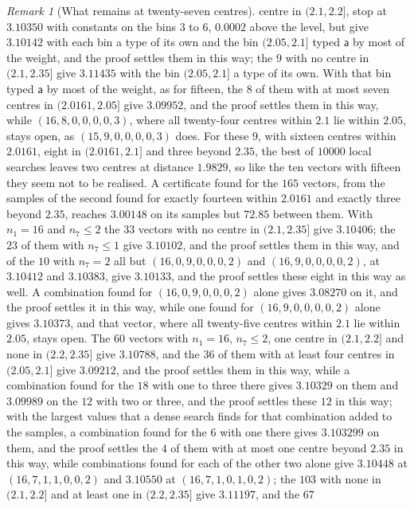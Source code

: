 \documentclass[11pt,reqno]{amsart}
\renewcommand{\_}{\origunderscore\allowbreak}
\numberwithin{equation}{section}
\theoremstyle{plain}
\theoremstyle{definition}
\theoremstyle{remark}
\newtheorem{remark}[thm]{Remark}
\begin{document}
\begin{remark}[What remains at twenty-seven centres]
centre in $(2.1,2.2]$, stop at $3.10350$ with constants on the bins $3$ to
$6$, $0.0002$ above the level, but give $3.10142$ with each bin a type of
its own and the bin $(2.05,2.1]$ typed $\mathsf a$ by most of the weight,
and the proof settles them in this way; the $9$ with no centre in $(2.1,2.35]$
give $3.11435$ with the bin $(2.05,2.1]$ a type of its own. With that bin
typed $\mathsf a$ by most of the weight, as for fifteen, the $8$ of them
with at most seven centres in $(2.0161,2.05]$ give $3.09952$, and the proof
settles them in this way, while $(16,8,0,0,0,0,3)$, where all twenty-four
centres within $2.1$ lie within $2.05$, stays open, as $(15,9,0,0,0,0,3)$
does. For these $9$, with sixteen centres within $2.0161$, eight in
$(2.0161,2.1]$ and three beyond $2.35$, the best of $10000$ local searches
leaves two centres at distance $1.9829$, so like the ten vectors with
fifteen they seem not to be realised. A certificate
found for the $165$ vectors,
from the samples of the second found for exactly fourteen within $2.0161$
and exactly three beyond $2.35$, reaches $3.00148$ on its samples but
$72.85$ between them. With $n_1=16$ and $n_7\le2$ the $33$ vectors with no
centre in $(2.1,2.35]$ give $3.10406$; the $23$ of them
with $n_7\le1$ give $3.10102$, and the proof settles them in this way,
and of the $10$ with $n_7=2$ all but $(16,0,9,0,0,0,2)$ and
$(16,9,0,0,0,0,2)$, at $3.10412$ and $3.10383$, give $3.10133$, and the
proof settles these eight in this way as well. A combination found for
$(16,0,9,0,0,0,2)$ alone gives $3.08270$ on it, and the proof settles it in
this way, while one found for $(16,9,0,0,0,0,2)$ alone gives $3.10373$, and
that vector, where all twenty-five centres within $2.1$ lie within $2.05$,
stays open. The $60$
vectors with $n_1=16$, $n_7\le2$, one centre in $(2.1,2.2]$ and none in
$(2.2,2.35]$ give $3.10788$, and the $36$ of them with at least four centres in $(2.05,2.1]$ give $3.09212$, and the proof settles them in this way, while a combination found for the $18$ with one to three there gives $3.10329$ on them and $3.09989$ on the $12$ with two or three, and the proof settles these $12$ in this way; with the largest values that a dense search finds for that combination added to the samples, a combination found for the $6$ with one there gives $3.103299$ on them, and the proof settles the $4$ of them with at most one centre beyond $2.35$ in this way, while combinations found for each of the other two alone give $3.10448$ at $(16,7,1,1,0,0,2)$ and $3.10550$ at $(16,7,1,0,1,0,2)$; the $103$ with none in
$(2.1,2.2]$ and at least one in $(2.2,2.35]$ give $3.11197$, and the $67$

\end{remark}
\end{document}
